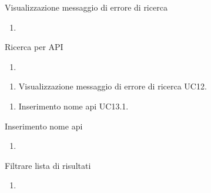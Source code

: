 \begin{usecase}{12}{Visualizzazione messaggio di errore di ricerca}\label{uc:}
    \usecasepre{}
    \usecasedesc{}
    \usecasepost{}

    \usecasemain{}
        \begin{enumerate}
            \item 
        \end{enumerate}

\end{usecase}


\begin{usecase}{13}{Ricerca per API}\label{uc:}
    \usecasepre{}
    \usecasedesc{}
    \usecasepost{}

    \usecasemain{}
        \begin{enumerate}
            \item 
        \end{enumerate}

    \usecaseext{}
        \begin{enumerate}
            \item Visualizzazione messaggio di errore di ricerca UC12.
        \end{enumerate}

    \usecasegen{}
        \begin{enumerate}
            \item Inserimento nome api UC13.1.
        \end{enumerate}

\end{usecase}


\begin{usecase}{13.1}{Inserimento nome api}\label{uc:inserimento-nome-api}
    \usecasepre{}
    \usecasedesc{}
    \usecasepost{}

    \usecasemain{}
        \begin{enumerate}
            \item 
        \end{enumerate}

\end{usecase}



\begin{usecase}{14}{Filtrare lista di risultati}\label{uc:}
    \usecasepre{}
    \usecasedesc{}
    \usecasepost{}

    \usecasemain{}
        \begin{enumerate}
            \item 
        \end{enumerate}

\end{usecase}

